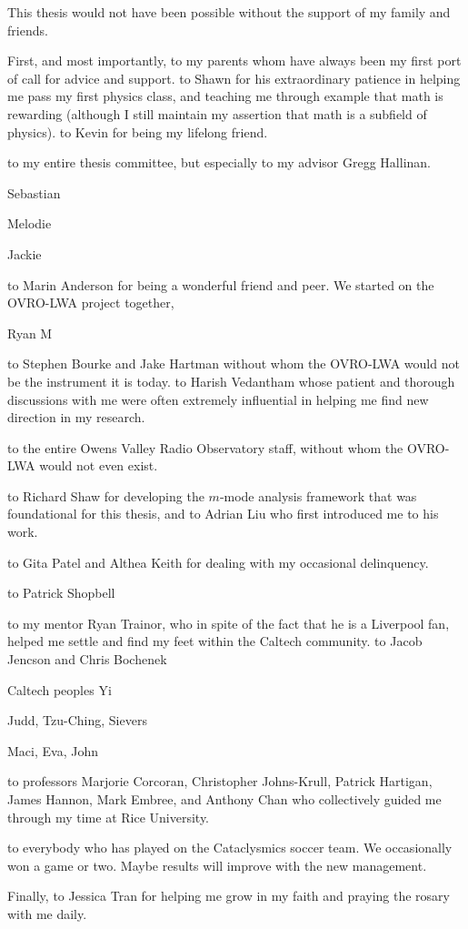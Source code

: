 \documentclass[12pt]{caltech_thesis}
\begin{document}
\begin{acknowledgements}
    This thesis would not have been possible without the support of my family and friends.

    First, and most importantly, \ty to my parents whom have always been my first port of call for
    advice and support.  \Ty to Shawn for his extraordinary patience in helping me pass my first
    physics class, and teaching me through example that math is rewarding (although I still maintain
    my assertion that math is a subfield of physics).  \Ty to Kevin for being my lifelong friend.

    \Ty to my entire thesis committee, but especially to my advisor Gregg Hallinan.

    Sebastian

    Melodie

    Jackie

    \Ty to Marin Anderson for being a wonderful friend and peer. We started on the OVRO-LWA project
    together,

    Ryan M

    \Ty to Stephen Bourke and Jake Hartman without whom the OVRO-LWA would not be the instrument it
    is today. \Ty to Harish Vedantham whose patient and thorough discussions with me were often
    extremely influential in helping me find new direction in my research.

    \Ty to the entire Owens Valley Radio Observatory staff, without whom the OVRO-LWA would not even
    exist.

    \Ty to Richard Shaw for developing the $m$-mode analysis framework that was foundational for
    this thesis, and to Adrian Liu who first introduced me to his work.

    \Ty to Gita Patel and Althea Keith for dealing with my occasional delinquency.

    \Ty to Patrick Shopbell

    \Ty to my mentor Ryan Trainor, who in spite of the fact that he is a Liverpool fan, helped me
    settle and find my feet within the Caltech community. \Ty to Jacob Jencson and Chris Bochenek

    Caltech peoples
    Yi

    Judd, Tzu-Ching, Sievers

    Maci, Eva, John

    \Ty to professors Marjorie Corcoran, Christopher Johns-Krull, Patrick Hartigan, James
    Hannon, Mark Embree, and Anthony Chan who collectively guided me through my time at Rice
    University.

    \Ty to everybody who has played on the Cataclysmics soccer team. We occasionally won a game or
    two. Maybe results will improve with the new management.

    Finally, \ty to Jessica Tran for helping me grow in my faith and praying the rosary with
    me daily.



\end{acknowledgements}
\end{document}
